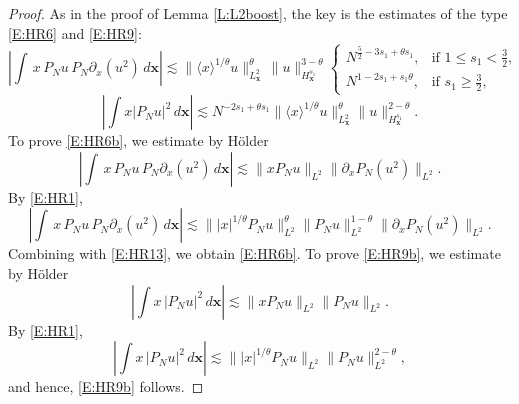 \documentclass[12pt,letterpaper]{amsart}
\newcommand{\la}{\langle}
\newcommand{\ra}{\rangle}
\theoremstyle{remark}
\numberwithin{equation}{section}
\numberwithin{theorem}{section}
\numberwithin{table}{section}
\begin{document}
\begin{proof}
As in the proof of Lemma \ref{L:L2boost}, the key is the estimates of the type \eqref{E:HR6} and \eqref{E:HR9}:
\begin{equation}
\label{E:HR6b}
\left|\int \, x \, P_N u \, P_N\partial_x (u^2) \, d\mathbf{x}\right| \lesssim 
\| \la x\ra^{1/\theta} u \|_{L_{\mathbf{x}}^2}^\theta \, \| u \|_{H_{\mathbf{x}}^{s_1}}^{3-\theta} \begin{cases} N^{\frac52-3s_1+\theta s_1}, & \text{if }1\leq s_1 < \frac32, \\
N^{1-2s_1+s_1\theta}, & \text{if } s_1\geq \frac32,
\end{cases}
\end{equation}
\begin{equation}
\label{E:HR9b}
\left| \int x |P_Nu|^2 \, d\mathbf{x} \right| \lesssim 
N^{-2s_1+\theta s_1} 
\|\la x \ra^{1/\theta}  u \|_{L_{\mathbf{x}}^2}^\theta \| u \|_{H_{\mathbf{x}}^{s_1}}^{2-\theta}.
\end{equation}
To prove \eqref{E:HR6b}, we estimate by H\"older 
$$
\left|\int \, x \, P_N u \, P_N\partial_x (u^2) \, d\mathbf{x}\right|  \lesssim \| xP_N u \|_{L^2} \|\partial_x P_N (u^2) \|_{L^2}.
$$
By \eqref{E:HR1}, 
$$
\left|\int \, x \, P_N u \, P_N\partial_x (u^2) \, d\mathbf{x}\right| \lesssim \| |x|^{1/\theta} P_N u \|_{L^2}^\theta  \|  P_N u \|_{L^2}^{1-\theta} \|\partial_x P_N (u^2) \|_{L^2}.
$$
Combining with \eqref{E:HR13}, we obtain \eqref{E:HR6b}.  To prove \eqref{E:HR9b}, we estimate by 
H\"older
$$
\left| \int x \, |P_Nu|^2 \, d\mathbf{x} \right| \lesssim \| xP_N u \|_{L^2} \|P_N u \|_{L^2}.
$$
By \eqref{E:HR1}, 
$$
\left| \int x \, |P_Nu|^2 \, d\mathbf{x} \right| \lesssim \| |x|^{1/\theta} P_N u \|_{L^2}  \|P_N u \|_{L^2}^{2-\theta},
$$
and hence, \eqref{E:HR9b} follows.   


\end{proof}
\end{document}
